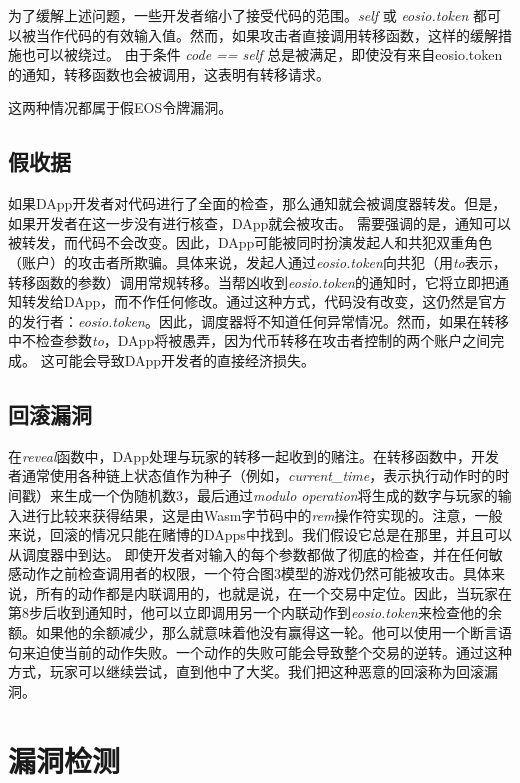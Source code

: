 \documentclass{SCIS2022cn}
\begin{document}
为了缓解上述问题，一些开发者缩小了接受代码的范围。\textit{self} 或 \textit{eosio.token} 都可以被当作代码的有效输入值。然而，如果攻击者直接调用转移函数，这样的缓解措施也可以被绕过。
由于条件 \textit{code == self} 总是被满足，即使没有来自eosio.token的通知，转移函数也会被调用，这表明有转移请求。

这两种情况都属于假EOS令牌漏洞\cite{7}。

\subsection{假收据}

如果DApp开发者对代码进行了全面的检查，那么通知就会被调度器转发。但是，如果开发者在这一步没有进行核查，DApp就会被攻击。
需要强调的是，通知可以被转发，而代码不会改变。因此，DApp可能被同时扮演发起人和共犯双重角色（账户）的攻击者所欺骗。具体来说，发起人通过\textit{eosio.token}向共犯（用\textit{to}表示，转移函数的参数）调用常规转移。当帮凶收到\textit{eosio.token}的通知时，它将立即把通知转发给DApp，而不作任何修改。通过这种方式，代码没有改变，这仍然是官方的发行者：\textit{eosio.token}。因此，调度器将不知道任何异常情况。然而，如果在转移中不检查参数\textit{to}，DApp将被愚弄，因为代币转移在攻击者控制的两个账户之间完成。
这可能会导致DApp开发者的直接经济损失。

\subsection{回滚漏洞}

在\textit{reveal}函数中，DApp处理与玩家的转移一起收到的赌注。在转移函数中，开发者通常使用各种链上状态值作为种子（例如，\textit{current\_time}，表示执行动作时的时间戳）来生成一个伪随机数3，最后通过\textit{modulo operation}将生成的数字与玩家的输入进行比较来获得结果，这是由Wasm字节码中的\textit{rem}操作符实现的。注意，一般来说，回滚的情况只能在赌博的DApps中找到。我们假设它总是在那里，并且可以从调度器中到达。
即使开发者对输入的每个参数都做了彻底的检查，并在任何敏感动作之前检查调用者的权限，一个符合图3模型的游戏仍然可能被攻击。具体来说，所有的动作都是内联调用的，也就是说，在一个交易中定位。因此，当玩家在第8步后收到通知时，他可以立即调用另一个内联动作到\textit{eosio.token}来检查他的余额。如果他的余额减少，那么就意味着他没有赢得这一轮。他可以使用一个断言语句来迫使当前的动作失败。一个动作的失败可能会导致整个交易的逆转。通过这种方式，玩家可以继续尝试，直到他中了大奖。我们把这种恶意的回滚称为回滚漏洞。

\section{漏洞检测}
\end{document}
